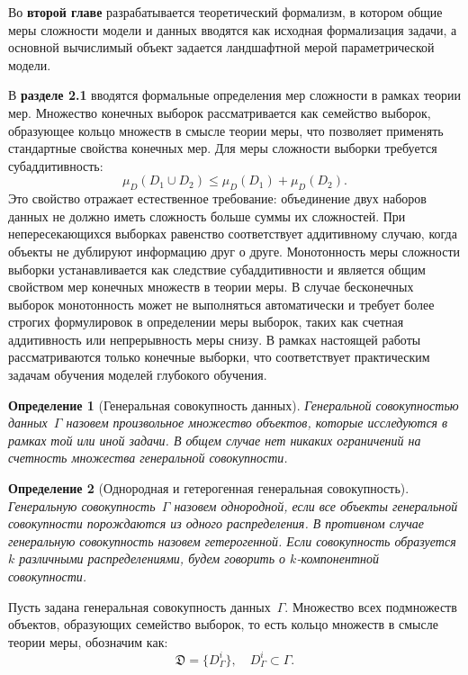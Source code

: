 \documentclass{dissert}
\newtheorem{definition}{Определение}
\begin{document}
Во \textbf{второй главе} разрабатывается теоретический формализм, в котором общие меры сложности модели и данных вводятся как исходная формализация задачи, а основной вычислимый объект задается ландшафтной мерой параметрической модели.

В \textbf{разделе 2.1} вводятся формальные определения мер сложности в рамках теории мер.
Множество конечных выборок рассматривается как семейство выборок, образующее кольцо множеств в смысле теории меры, что позволяет применять стандартные свойства конечных мер.
Для меры сложности выборки требуется субаддитивность:
\[
    \mu_D(D_1\cup D_2)\le \mu_D(D_1)+\mu_D(D_2).
\]
Это свойство отражает естественное требование: объединение двух наборов данных не должно иметь сложность больше суммы их сложностей.
При непересекающихся выборках равенство соответствует аддитивному случаю, когда объекты не дублируют информацию друг о друге.
Монотонность меры сложности выборки устанавливается как следствие субаддитивности и является общим свойством мер конечных множеств в теории меры. В случае бесконечных выборок монотонность может не выполняться автоматически и требует более строгих формулировок в определении меры выборок, таких как счетная аддитивность или непрерывность меры снизу. В рамках настоящей работы рассматриваются только конечные выборки, что соответствует практическим задачам обучения моделей глубокого обучения.

\begin{definition}[Генеральная совокупность данных]
    Генеральной совокупностью данных~$\Gamma$ назовем произвольное множество объектов, которые исследуются в рамках той или иной задачи. В общем случае нет никаких ограничений на счетность множества генеральной совокупности.
\end{definition}

\begin{definition}[Однородная и гетерогенная генеральная совокупность]
    Генеральную совокупность~$\Gamma$ назовем однородной, если все объекты генеральной совокупности порождаются из одного распределения. В противном случае генеральную совокупность назовем гетерогенной. Если совокупность образуется $k$ различными распределениями, будем говорить о $k$-компонентной совокупности.
\end{definition}

Пусть задана генеральная совокупность данных~$\Gamma$.
Множество всех подмножеств объектов, образующих семейство выборок, то есть кольцо множеств в смысле теории меры, обозначим как:
\[
    \mathfrak{D} = \{D_\Gamma^i\}, \quad D_\Gamma^i \subset \Gamma.
\]
\end{document}
